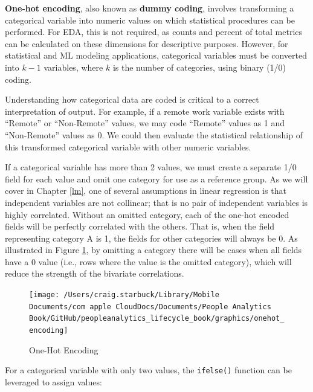 \documentclass[
]{book}
\newenvironment{Shaded}{\begin{snugshade}}{\end{snugshade}}
\newcommand{\CommentTok}[1]{\textcolor[rgb]{0.56,0.35,0.01}{\textit{#1}}}
\newcommand{\FunctionTok}[1]{\textcolor[rgb]{0.00,0.00,0.00}{#1}}
\newcommand{\NormalTok}[1]{#1}
\newcommand{\SpecialCharTok}[1]{\textcolor[rgb]{0.00,0.00,0.00}{#1}}
\begin{document}
\textbf{One-hot encoding}, also known as \textbf{dummy coding}, involves transforming a categorical variable into numeric values on which statistical procedures can be performed. For EDA, this is not required, as counts and percent of total metrics can be calculated on these dimensions for descriptive purposes. However, for statistical and ML modeling applications, categorical variables must be converted into \(k-1\) variables, where \(k\) is the number of categories, using binary (1/0) coding.

Understanding how categorical data are coded is critical to a correct interpretation of output. For example, if a remote work variable exists with ``Remote'' or ``Non-Remote'' values, we may code ``Remote'' values as 1 and ``Non-Remote'' values as 0. We could then evaluate the statistical relationship of this transformed categorical variable with other numeric variables.

If a categorical variable has more than 2 values, we must create a separate 1/0 field for each value and omit one category for use as a reference group. As we will cover in Chapter \ref{lm}, one of several assumptions in linear regression is that independent variables are not collinear; that is no pair of independent variables is highly correlated. Without an omitted category, each of the one-hot encoded fields will be perfectly correlated with the others. That is, when the field representing category A is 1, the fields for other categories will always be 0. As illustrated in Figure \ref{fig:onehot-encoding}, by omitting a category there will be cases when all fields have a 0 value (i.e., rows where the value is the omitted category), which will reduce the strength of the bivariate correlations.

\begin{figure}

{\centering \texttt{[image: /Users/craig.starbuck/Library/Mobile Documents/com~apple~CloudDocs/Documents/People Analytics Book/GitHub/peopleanalytics\_lifecycle\_book/graphics/onehot\_encoding]} 

}

\caption{One-Hot Encoding}\label{fig:onehot-encoding}
\end{figure}

For a categorical variable with only two values, the \texttt{ifelse()} function can be leveraged to assign values:

\begin{Shaded}
\end{Shaded}
\end{document}
